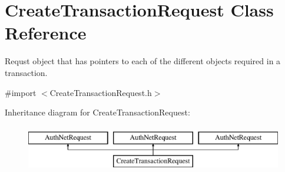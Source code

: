\hypertarget{interface_create_transaction_request}{
\section{CreateTransactionRequest Class Reference}
\label{interface_create_transaction_request}
}


Requst object that has pointers to each of the different objects required in a transaction.  




{\ttfamily \#import $<$CreateTransactionRequest.h$>$}

Inheritance diagram for CreateTransactionRequest:\begin{figure}[H]
\begin{center}
\leavevmode
\includegraphics[height=2.000000cm]{interface_create_transaction_request}
\end{center}
\end{figure}
